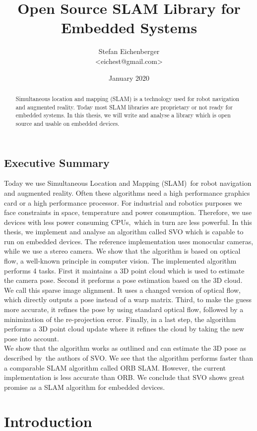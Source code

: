 \documentclass[11pt,a4paper,titlepage,oneside]{report}
\title{Open Source SLAM Library for Embedded Systems}
\author{Stefan Eichenberger\\<eichest@gmail.com>}
\date{January 2020}
\begin{document}
\maketitle
\begin{abstract}
  Simultaneous location and mapping (SLAM) is a technology used for robot navigation and augmented reality. Today most SLAM libraries are proprietary or not ready for embedded systems. In this thesis, we will write and analyse a library which is open source and usable on embedded devices.
\end{abstract}

\section*{Executive Summary}
Today we use Simultaneous Location and Mapping (SLAM) for robot navigation and augmented reality. Often these algorithms need a high performance graphics card or a high performance processor. For industrial and robotics purposes we face constraints in space, temperature and power consumption. Therefore, we use devices with less power consuming CPUs, which in turn are less powerful. In this thesis, we implement and analyse an algorithm called SVO which is capable to run on embedded devices. The reference implementation uses monocular cameras, while we use a stereo camera. We show that the algorithm is based on optical flow, a well-known principle in computer vision. The implemented algorithm performs 4 tasks. First it maintains a 3D point cloud which is used to estimate the camera pose. Second it preforms a pose estimation based on the 3D cloud. We call this sparse image alignment. It uses a changed version of optical flow, which directly outputs a pose instead of a warp matrix. Third, to make the guess more accurate, it refines the pose by using standard optical flow, followed by a minimization of the re-projection error. Finally, in a last step, the algorithm performs a 3D point cloud update where it refines the cloud by taking the new pose into account.\\
We show that the algorithm works as outlined and can estimate the 3D pose as described by the authors of SVO. We see that the algorithm performs faster than a comparable SLAM algorithm called ORB SLAM. However, the current implementation is less accurate than ORB. We conclude that SVO shows great promise as a SLAM algorithm for embedded devices.

\tableofcontents

\chapter{Introduction}
\end{document}

